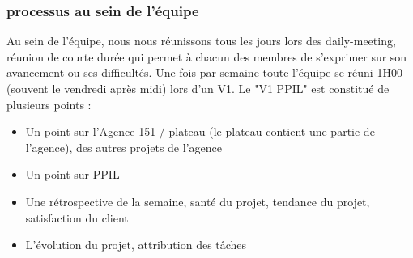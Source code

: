\subsubsection{processus au sein de l'équipe}
Au sein de l'équipe, nous nous réunissons tous les jours lors des daily-meeting, réunion de courte durée qui permet à chacun des membres de s'exprimer sur son avancement ou ses difficultés. Une fois par semaine toute l'équipe se réuni 1H00 (souvent le vendredi après midi) lors d'un V1. 
Le "V1 PPIL" est constitué de plusieurs points :
\begin{itemize}
    \item Un point sur l'Agence 151 / plateau (le plateau contient une partie de l'agence), des autres projets de l'agence
    \item Un point sur PPIL
    \item Une rétrospective de la semaine, santé du projet, tendance du projet, satisfaction du client
    \item L'évolution du projet, attribution des tâches
\end{itemize}
